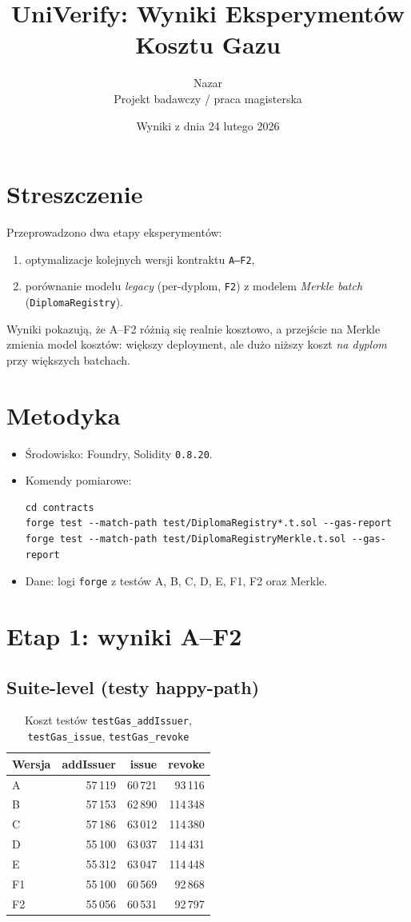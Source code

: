 \documentclass[11pt,a4paper]{article}
\title{UniVerify: Wyniki Eksperymentów Kosztu Gazu}
\author{Nazar\\Projekt badawczy / praca magisterska}
\date{Wyniki z dnia 24 lutego 2026}
\begin{document}
\maketitle

\section{Streszczenie}
Przeprowadzono dwa etapy eksperymentów:
\begin{enumerate}
  \item optymalizacje kolejnych wersji kontraktu \texttt{A--F2},
  \item porównanie modelu \textit{legacy} (per-dyplom, \texttt{F2}) z modelem \textit{Merkle batch} (\texttt{DiplomaRegistry}).
\end{enumerate}
Wyniki pokazują, że A--F2 różnią się realnie kosztowo, a przejście na Merkle zmienia model kosztów: większy deployment, ale dużo niższy koszt \textit{na dyplom} przy większych batchach.

\section{Metodyka}
\begin{itemize}
  \item Środowisko: Foundry, Solidity \texttt{0.8.20}.
  \item Komendy pomiarowe:
\begin{verbatim}
cd contracts
forge test --match-path test/DiplomaRegistry*.t.sol --gas-report
forge test --match-path test/DiplomaRegistryMerkle.t.sol --gas-report
\end{verbatim}
  \item Dane: logi \texttt{forge} z testów A, B, C, D, E, F1, F2 oraz Merkle.
\end{itemize}

\section{Etap 1: wyniki A--F2}
\subsection{Suite-level (testy happy-path)}
\begin{table}[h]
\centering
\caption{Koszt testów \texttt{testGas\_addIssuer}, \texttt{testGas\_issue}, \texttt{testGas\_revoke}}
\begin{tabular}{lrrr}
\toprule
Wersja & addIssuer & issue & revoke \\
\midrule
A  & 57\,119 & 60\,721 & 93\,116 \\
B  & 57\,153 & 62\,890 & 114\,348 \\
C  & 57\,186 & 63\,012 & 114\,380 \\
D  & 55\,100 & 63\,037 & 114\,431 \\
E  & 55\,312 & 63\,047 & 114\,448 \\
F1 & 55\,100 & 60\,569 & 92\,868 \\
F2 & 55\,056 & 60\,531 & 92\,797 \\
\bottomrule
\end{tabular}
\end{table}
\end{document}

